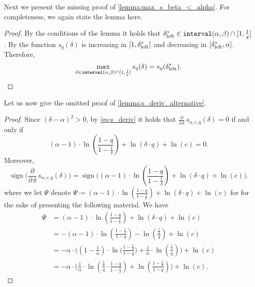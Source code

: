 \documentclass[letterpaper,11pt]{article}
\DeclareMathOperator{\sign}{sign}
\newcommand{\1}[1]{\mathds{1}\left[#1\right]}
\newcommand{\goodd}{\textnormal{\texttt{interval}}(\alpha, \beta)}
\newcommand{\sdeltal}{\delta^{*}_{\textnormal{left}}}
\begin{document}
Next we present the missing proof of \cref{lemma:max_s_beta_<_alpha}. For completeness, we again state the lemma
here.

\maxsbetasmalleralpha*
\begin{proof}
	By the conditions of the lemma it holds that $\sdeltal \in \goodd \cap [1,\frac{1}{q}]$.
	 By   the function $s_q(\delta)$ is increasing in $[1,\sdeltal]$ and decreasing in $[\sdeltal, \alpha]$.  Therefore,
	 $$
	 \max_{\delta \in \goodd \cap [1,\frac{1}{q}]} s_q(\delta) = s_q(\sdeltal).	 $$
\end{proof}

Let us now give the omitted proof of \cref{lemma:s_deriv_alternative}.

\sderivalternative*
\begin{proof}
	Since $(\delta - \alpha)^{2} > 0$, by \eqref{eq:s_deriv} it holds that $\frac{\partial}{\partial\,\delta}\,s_{\alpha,c,q}(\delta) = 0$ if and only if
	\begin{equation}\label{eq:s_deriv_iff}
		(\alpha - 1) \cdot \ln\left( \frac{1 -q}{1 - \frac{1}{\delta}} \right) + \ln\left( \delta \cdot q \right) + \ln(c) = 0.
	\end{equation}
	Moreover,
	\begin{equation}\label{eq:s_deriv_sign_inter}
		\sign\biggl(\frac{\partial}{\partial\,\delta}\,s_{\alpha,c,q}(\delta)\biggr) = \sign\biggl((\alpha - 1) \cdot \ln\left( \frac{1 -q}{1 - \frac{1}{\delta}} \right) + \ln\left( \delta \cdot q \right) + \ln(c)\biggr).
	\end{equation}
	where we let $\Psi$ denote $\Psi \coloneqq (\alpha - 1) \cdot \ln\left( \frac{1 -q}{1 - \frac{1}{\delta}} \right) + \ln\left( \delta \cdot q \right) + \ln(c)$ for
	for the sake of presenting the following material.
	We have
	\begin{align*}
		\Psi &= (\alpha - 1) \cdot \ln\left( \frac{1 -q}{1 - \frac{1}{\delta}} \right) + \ln\left( \delta \cdot q \right) + \ln(c)\\
		     &= -(\alpha - 1) \cdot \ln\left( \frac{1 - \frac{1}{\delta}}{1 - q} \right) -\ln\left(\frac{\frac{1}{\delta}}{q}\right) + \ln(c) \\
														  &= -\alpha \cdot \Biggl(\left( 1 - \frac{1}{\alpha} \right)\cdot \ln\biggl( \frac{ 1 - \frac{1}{\delta} }{1 - q}  \biggr) + \frac{1}{\alpha} \cdot \ln\left(\frac{\frac{1}{\delta}}{q}\right)  \Biggr) + \ln(c)\\
														  &= -\alpha \cdot \Biggl( \frac{1}{\alpha} \cdot \ln\left( \frac{\frac{1}{\delta}}{q} \cdot \frac{1 - q}{1 - \frac{1}{\delta}} \right) + \ln\left( \frac{1 - \frac{1}{\delta}}{1 - q} \right)  \Biggr) + \ln(c).
	\end{align*}
	

\end{proof}
\end{document}
